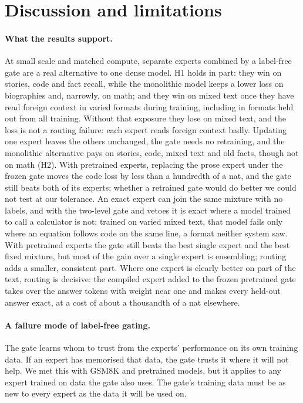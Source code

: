\documentclass[10pt]{article}
\begin{document}
\section{Discussion and limitations}
\label{sec:discussion}

\paragraph{What the results support.} At small scale and matched compute, separate experts
combined by a label-free gate are a real alternative to one dense model. H1 holds in part: they
win on stories, code and fact recall, while the monolithic model keeps a lower loss on
biographies and, narrowly, on math; and they win on mixed text once they have read foreign context in
varied formats during training, including in formats held out from all training. Without that
exposure they lose on mixed text, and the loss is not a routing failure: each expert reads
foreign context badly. Updating one expert leaves the others unchanged, the gate needs no
retraining, and the monolithic alternative pays on stories, code, mixed text and old facts,
though not on math (H2). With pretrained experts, replacing the prose expert under the frozen
gate moves the code loss by less than a hundredth of a nat, and the gate still beats both of its
experts; whether a retrained gate would do better we could not test at our tolerance. An exact expert
can join the same mixture with no labels, and with the two-level gate and vetoes it is exact
where a model trained to call a calculator is not; trained on varied mixed text, that model
fails only where an equation follows code on the same line, a format neither system saw. With
pretrained experts the gate still beats
the best single expert and the best fixed mixture, but most of the gain over a single expert is
ensembling; routing adds a smaller, consistent part. Where one expert is clearly better on
part of the text, routing is decisive: the compiled expert added to the frozen pretrained gate
takes over the answer tokens with weight near one and makes every held-out answer exact, at a
cost of about a thousandth of a nat elsewhere.

\paragraph{A failure mode of label-free gating.} The gate learns whom to trust from the
experts' performance on its own training data. If an expert has memorised that data, the gate
trusts it where it will not help. We met this with GSM8K and pretrained models, but it applies to
any expert trained on data the gate also uses. The gate's training data must be as new to every
expert as the data it will be used on.
\end{document}
